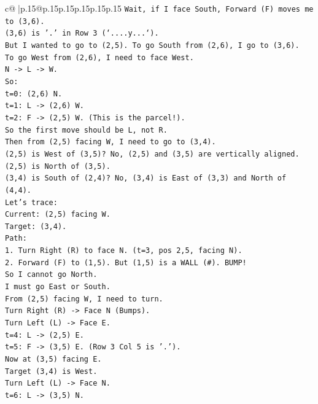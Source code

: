 \documentclass{article}
\begin{document}
{\begin{supertabular}{c@{$\;$}|p{.15\linewidth}@{}p{.15\linewidth}p{.15\linewidth}p{.15\linewidth}p{.15\linewidth}p{.15\linewidth}}
{{{\texttt{Wait, if I face South, Forward (F) moves me to (3,6).} \\
\texttt{(3,6) is '.' in Row 3 (`....y...`).} \\
\texttt{But I wanted to go to (2,5). To go South from (2,6), I go to (3,6).} \\
\texttt{To go West from (2,6), I need to face West.} \\
\texttt{N {-}> L {-}> W.} \\
\texttt{So:} \\
\texttt{t=0: (2,6) N.} \\
\texttt{t=1: L {-}> (2,6) W.} \\
\texttt{t=2: F {-}> (2,5) W. (This is the parcel!).} \\
\texttt{So the first move should be L, not R.} \\
\texttt{Then from (2,5) facing W, I need to go to (3,4).} \\
\texttt{(2,5) is West of (3,5)? No, (2,5) and (3,5) are vertically aligned.} \\
\texttt{(2,5) is North of (3,5).} \\
\texttt{(3,4) is South of (2,4)? No, (3,4) is East of (3,3) and North of (4,4).} \\
\texttt{Let's trace:} \\
\texttt{Current: (2,5) facing W.} \\
\texttt{Target: (3,4).} \\
\texttt{Path:} \\
\texttt{1. Turn Right (R) to face N. (t=3, pos 2,5, facing N).} \\
\texttt{2. Forward (F) to (1,5). But (1,5) is a WALL (\#). BUMP!} \\
\texttt{So I cannot go North.} \\
\texttt{I must go East or South.} \\
\texttt{From (2,5) facing W, I need to turn.} \\
\texttt{Turn Right (R) {-}> Face N (Bumps).} \\
\texttt{Turn Left (L) {-}> Face E.} \\
\texttt{t=4: L {-}> (2,5) E.} \\
\texttt{t=5: F {-}> (3,5) E. (Row 3 Col 5 is '.').} \\
\texttt{Now at (3,5) facing E.} \\
\texttt{Target (3,4) is West.} \\
\texttt{Turn Left (L) {-}> Face N.} \\
\texttt{t=6: L {-}> (3,5) N.} \\
}}}
\end{supertabular}}
\end{document}
